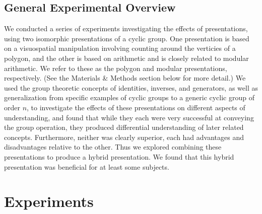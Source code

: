 \documentclass[man,10pt]{apa6}
\begin{document}
\subsection{General Experimental Overview}
We conducted a series of experiments investigating the effects of presentations, using two isomorphic presentations of a cyclic group. One presentation is based on a visuospatial manipulation involving counting around the verticies of a polygon, and the other is based on arithmetic and is closely related to modular arithmetic. We refer to these as the polygon and modular presentations, respectively. (See the Materials \& Methods section below for more detail.) We used the group theoretic concepts of identities, inverses, and generators, as well as generalization from specific examples of cyclic groups to a generic cyclic group of order $n$, to investigate the effects of these presentations on different aspects of understanding, and found that while they each were very successful at conveying the group operation, they produced differential understanding of later related concepts. Furthermore, neither was clearly superior, each had advantages and disadvantages relative to the other. Thus we explored combining these presentations to produce a hybrid presentation. We found that this hybrid presentation was beneficial for at least some subjects. 
\section{Experiments}
\end{document}
